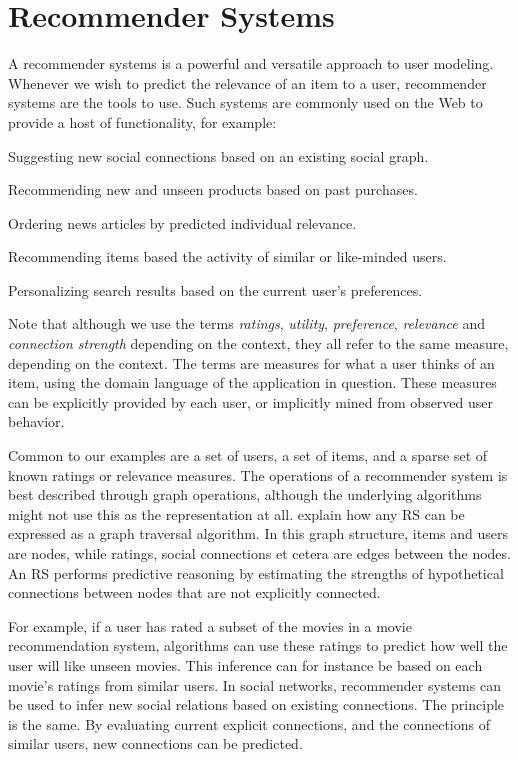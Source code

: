 \section{Recommender Systems}
\label{sec:recommender}

A recommender systems is a powerful and versatile approach to user modeling.
Whenever we wish to predict the relevance of an item to a user, recommender systems are the tools to use.
Such systems are commonly used on the Web to provide a host of functionality,
for example:

\begin{itemize*}
  \item Suggesting new social connections based on an existing social graph.
  \item Recommending new and unseen products based on past purchases.
  \item Ordering news articles by predicted individual relevance.
  \item Recommending items based the activity of similar or like-minded users.
  \item Personalizing search results based on the current user's preferences.
\end{itemize*}

Note that although we use the terms 
\emph{ratings}, \emph{utility}, \emph{preference}, \emph{relevance} and \emph{connection strength} depending on the context, 
they all refer to the same measure, depending on the context. 
The terms are measures for what a user thinks of an item, using the domain language of the application in question.
These measures can be explicitly provided by each user, or implicitly mined from observed user behavior.

Common to our examples are a set of users, a set of items, and a sparse set of known ratings or relevance measures.
The operations of a recommender system is best described through graph operations, 
although the underlying algorithms might not use this as the representation at all.
\cite{Mirza2003} explain how any RS can be expressed as a graph traversal algorithm.
In this graph structure, items and users are nodes, while ratings, social connections et cetera are edges between the nodes.
An RS performs predictive reasoning by estimating the strengths of hypothetical connections between nodes that are not explicitly connected.

For example, if a user has rated a subset of the movies in a movie recommendation system, 
algorithms can use these ratings to predict how well the user will like unseen movies.
This inference can for instance be based on each movie's ratings from similar users.
In social networks, recommender systems can be used to infer new social relations 
based on existing connections. The principle is the same. By evaluating current explicit
connections, and the connections of similar users, new connections can be predicted.

